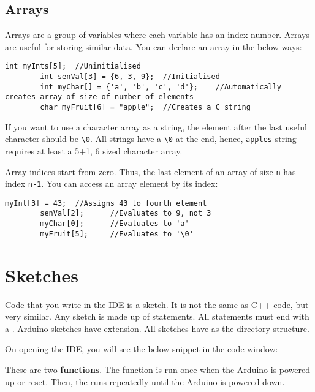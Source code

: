 \documentclass{article}
\begin{document}
	\subsection{Arrays}

		Arrays are a group of variables where each variable has an index number. Arrays are useful for storing similar data. You can declare an array in the below ways:

		\begin{lstlisting}[gobble=8]
		int myInts[5];	//Uninitialised
		int senVal[3] = {6, 3, 9};	//Initialised
		int myChar[] = {'a', 'b', 'c', 'd'};	//Automatically creates array of size of number of elements
		char myFruit[6] = "apple";	//Creates a C string
		\end{lstlisting}

		If you want to use a character array as a string, the element after the last useful character should be \texttt{\textbackslash0}. All strings have a \texttt{\textbackslash0} at the end, hence, \texttt{apples} string requires at least a 5+1, 6 sized character array.

		Array indices start from zero. Thus, the last element of an array of size \texttt{n} has index \texttt{n-1}. You can access an array element by its index:

		\begin{lstlisting}[gobble=8]
		myInt[3] = 43;	//Assigns 43 to fourth element
		senVal[2];		//Evaluates to 9, not 3
		myChar[0];		//Evaluates to 'a'
		myFruit[5];		//Evaluates to '\0'
		\end{lstlisting}

\section{Sketches}

	Code that you write in the IDE is a sketch. It is not the same as C++ code, but very similar. Any sketch is made up of statements. All statements must end with a \inlncd{;}. Arduino sketches have  extension. All sketches have  as the directory structure.

	On opening the IDE, you will see the below snippet in the code window:

	

	These are two \textbf{functions}. The  function is run once when the Arduino is powered up or reset. Then, the  runs repeatedly until the Arduino is powered down.
\end{document}
